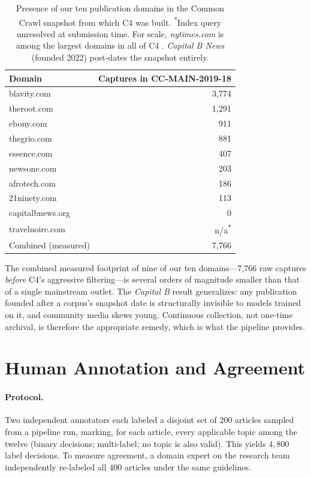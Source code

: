 \documentclass[letterpaper,twocolumn,10pt]{article}
\begin{document}
\begin{table}[t]
\centering
\small
\begin{tabular}{lr}
\toprule
Domain & Captures in CC-MAIN-2019-18 \\
\midrule
blavity.com        & 3{,}774 \\
theroot.com        & 1{,}291 \\
ebony.com          &   911 \\
thegrio.com        &   881 \\
essence.com        &   407 \\
newsone.com        &   203 \\
afrotech.com       &   186 \\
21ninety.com       &   113 \\
capitalbnews.org   &     0 \\
travelnoire.com    &   n/a\textsuperscript{*} \\
\midrule
Combined (measured) & 7{,}766 \\
\bottomrule
\end{tabular}
\caption{Presence of our ten publication domains in the Common Crawl
snapshot from which C4 was built. \textsuperscript{*}Index query
unresolved at submission time. For scale, \emph{nytimes.com} is among
the largest domains in all of C4 \protect\cite{dodge2021}.
\emph{Capital B News} (founded 2022) post-dates the snapshot entirely.}
\label{tab:audit}
\end{table}

The combined measured footprint of nine of our ten domains---7{,}766 raw
captures \emph{before} C4's aggressive filtering---is several orders of
magnitude smaller than that of a single mainstream outlet. The
\emph{Capital B} result generalizes: any publication founded after a
corpus's snapshot date is structurally invisible to models trained on
it, and community media skews young. Continuous collection, not one-time
archival, is therefore the appropriate remedy, which is what the
pipeline provides.

\section{Human Annotation and Agreement}
\label{sec:annotation}

\paragraph{Protocol.}
Two independent annotators each labeled a disjoint set of 200 articles
sampled from a pipeline run, marking, for each article, every applicable
topic among the twelve (binary decisions; multi-label; no topic is also
valid). This yields $4{,}800$ label decisions. To measure agreement, a
domain expert on the research team independently re-labeled all 400
articles under the same guidelines.
\end{document}
